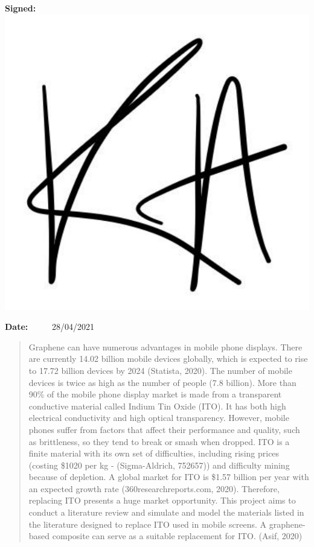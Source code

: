 \documentclass[a4paper,12pt]{article}
\numberwithin{equation}{section}
\numberwithin{figure}{section}
\begin{document}
\begin{titlepage}
{\Large \textbf{Signed: \ \includegraphics[height=1.2\baselineskip]{signature}}}
\vspace{1cm}

{\Large \textbf{Date:} \ \ \ \ \ 28/04/2021}
\end{titlepage}

\cleardoublepage

\begin{abstract}

\noindent Graphene can have numerous advantages in mobile phone displays. There are currently 14.02 billion mobile devices globally, which is expected to rise to 17.72 billion devices by 2024 (Statista, 2020). The number of mobile devices is twice as high as the number of people (7.8 billion). More than 90\% of the mobile phone display market is made from a transparent conductive material called Indium Tin Oxide (ITO). It has both high electrical conductivity and high optical transparency. However, mobile phones suffer from factors that affect their performance and quality, such as brittleness, so they tend to break or smash when dropped. ITO is a finite material with its own set of difficulties, including rising prices (costing \$1020 per kg - (Sigma-Aldrich, 752657)) and difficulty mining because of depletion. A global market for ITO is \$1.57 billion per year with an expected growth rate (360researchreports.com, 2020). Therefore, replacing ITO presents a huge market opportunity. This project aims to conduct a literature review and simulate and model the materials listed in the literature designed to replace ITO used in mobile screens. A graphene-based composite can serve as a suitable replacement for ITO. (Asif, 2020)

\end{abstract}
\pagebreak
\vspace{1cm}
\end{document}
